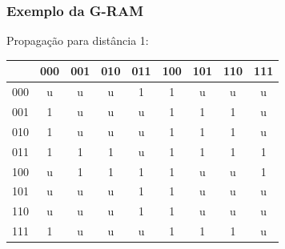 \documentclass{beamer}
\begin{document}
\begin{frame}
    \frametitle{Exemplo da G-RAM}
    Propagação para distância 1:

    \begin{table}
        \centering
        \begin{tabular}{|c|c|c|c|c|c|c|c|c|}
            \hline
                &       000 &       001 &       010 &       011 &       100 &       101 &       110 &       111\\
            \hline
            000 &        u  &        u  &        u  & \alert 1  &        1  &        u  &        u  &        u \\
            \hline
            001 &        1  &        u  &        u  &        u  &        1  &        1  &        1  &        u \\
            \hline
            010 &        1  &        u  &        u  &        u  &        1  &        1  &        1  &        u \\
            \hline
            011 &        1  &        1  &        1  &        u  &        1  &        1  &        1  &        1 \\
            \hline
            100 &        u  & \alert 1  & \alert 1  &        1  &        1  &        u  &        u  & \alert 1 \\
            \hline
            101 &        u  &        u  &        u  & \alert 1  &        1  &        u  &        u  &        u \\
            \hline
            110 &        u  &        u  &        u  & \alert 1  &        1  &        u  &        u  &        u \\
            \hline
            111 &        1  &        u  &        u  &        u  &        1  &        1  &        1  &        u \\
            \hline

        \end{tabular}
    \end{table}
\end{frame}
\end{document}
